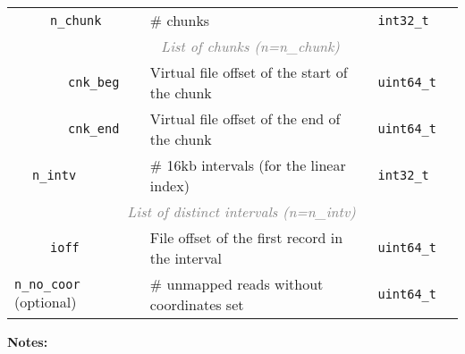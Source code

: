 \documentclass[10pt]{article}
\begin{document}
\begin{center}
\begin{tabular}{|l|l|l|l|l|l|l|}
\cline{3-7}
 & & \multicolumn{2}{l|}{\tt n\_chunk} & \# chunks & {\tt int32\_t} & \\
\cline{3-7}
 & & \multicolumn{5}{c|}{\textcolor{gray}{\it List of chunks (n=n\_chunk)}} \\
\cline{4-7}
 & & \hspace{0.1cm} & {\tt cnk\_beg} & Virtual file offset of the start of the chunk & {\tt uint64\_t} & \\
\cline{4-7}
 & & & {\tt cnk\_end} & Virtual file offset of the end of the chunk & {\tt uint64\_t} & \\
\cline{2-7}
 & \multicolumn{3}{l|}{\tt n\_intv} & \# 16kb intervals (for the linear index) & {\tt int32\_t} & \\
\cline{2-7}
 & \multicolumn{6}{c|}{\textcolor{gray}{\it List of distinct intervals (n=n\_intv)}} \\
\cline{3-7}
 & & \multicolumn{2}{l|}{\tt ioff} & File offset of the first record in the interval & {\tt uint64\_t} & \\
\hline
\multicolumn{4}{|l|}{{\tt n\_no\_coor} (optional)} & \# unmapped reads without coordinates set & {\tt uint64\_t} & \\
\hline
\end{tabular}
\end{center}

{\bf Notes:}
\end{document}
